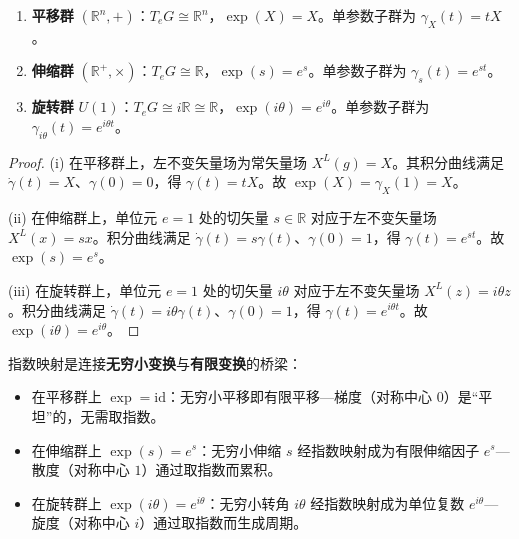 \begin{proposition}[三变换群的指数映射]\label{prop:three_exponential_maps}
\begin{enumerate}[label=(\roman*)]
    \item \textbf{平移群} $(\mathbb{R}^n, +)$：$T_eG \cong \mathbb{R}^n$，$\exp(X) = X$。单参数子群为 $\gamma_X(t) = tX$。
    \item \textbf{伸缩群} $(\mathbb{R}^+, \times)$：$T_eG \cong \mathbb{R}$，$\exp(s) = e^s$。单参数子群为 $\gamma_s(t) = e^{st}$。
    \item \textbf{旋转群} $U(1)$：$T_eG \cong i\mathbb{R} \cong \mathbb{R}$，$\exp(i\theta) = e^{i\theta}$。单参数子群为 $\gamma_{i\theta}(t) = e^{i\theta t}$。
\end{enumerate}
\end{proposition}

\begin{proof}
(i) 在平移群上，左不变矢量场为常矢量场 $X^L(g) = X$。其积分曲线满足 $\dot{\gamma}(t) = X$、$\gamma(0) = 0$，得 $\gamma(t) = tX$。故 $\exp(X) = \gamma_X(1) = X$。

(ii) 在伸缩群上，单位元 $e = 1$ 处的切矢量 $s \in \mathbb{R}$ 对应于左不变矢量场 $X^L(x) = sx$。积分曲线满足 $\dot{\gamma}(t) = s\gamma(t)$、$\gamma(0) = 1$，得 $\gamma(t) = e^{st}$。故 $\exp(s) = e^s$。

(iii) 在旋转群上，单位元 $e = 1$ 处的切矢量 $i\theta$ 对应于左不变矢量场 $X^L(z) = i\theta z$。积分曲线满足 $\dot{\gamma}(t) = i\theta\gamma(t)$、$\gamma(0) = 1$，得 $\gamma(t) = e^{i\theta t}$。故 $\exp(i\theta) = e^{i\theta}$。
\end{proof}

\begin{remark}[指数映射与三算子的对应]\label{rem:exponential_grammar}
指数映射是连接\textbf{无穷小变换}与\textbf{有限变换}的桥梁：
\begin{itemize}
    \item 在平移群上 $\exp = \text{id}$：无穷小平移即有限平移---梯度（对称中心 $0$）是“平坦”的，无需取指数。
    \item 在伸缩群上 $\exp(s) = e^s$：无穷小伸缩 $s$ 经指数映射成为有限伸缩因子 $e^s$---散度（对称中心 $1$）通过取指数而累积。
    \item 在旋转群上 $\exp(i\theta) = e^{i\theta}$：无穷小转角 $i\theta$ 经指数映射成为单位复数 $e^{i\theta}$---旋度（对称中心 $i$）通过取指数而生成周期。
\end{itemize}
\end{remark}

